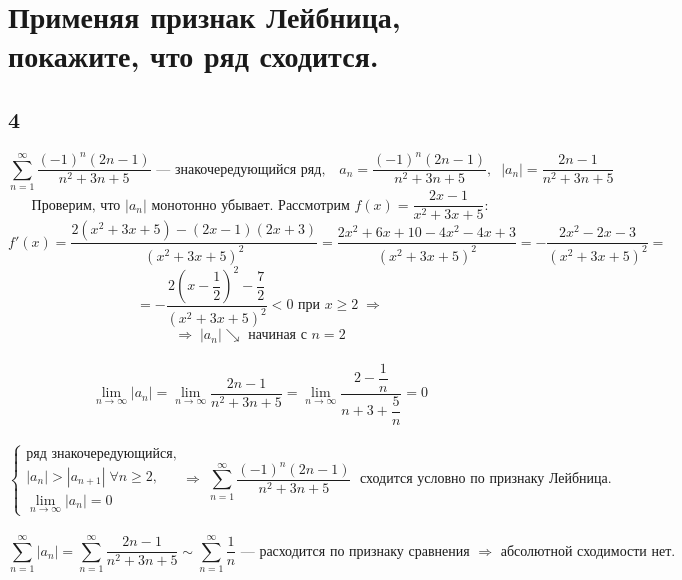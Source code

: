 \documentclass[a4paper,fleqn]{article}
\begin{document}
    \section*{Применяя признак Лейбница, покажите, что ряд сходится.}
    \subsection*{4}
    \[ \sum_{n=1}^{\infty} \dfrac{(-1)^n (2n-1)}{n^2 + 3n + 5} \text{ --- знакочередующийся ряд}, \;\;\;
		 a_n = \dfrac{(-1)^n (2n-1)}{n^2 + 3n + 5}, \;\; |a_n|  = \dfrac{2n-1}{n^2 + 3n + 5} \]
		\[ \text{Проверим, что $|a_n|$ монотонно убывает. Рассмотрим $f(x) = \dfrac{2x-1}{x^2 + 3x + 5}$:} \]
		\[ f'(x) = \dfrac{2(x^2 + 3x + 5) - (2x-1)(2x+3)}{(x^2 + 3x + 5)^2} = 
		\dfrac{2x^2 + 6x + 10 - 4x^2 - 4x + 3}{(x^2 + 3x + 5)^2} = 
		-\dfrac{2x^2 - 2x - 3}{(x^2 + 3x + 5)^2} = \]
		\[ = -\dfrac{2\left(x - \dfrac12\right)^2 - \dfrac72}{(x^2 + 3x + 5)^2} < 0 \text{ при } x \ge 2  \;\Rightarrow \]
		\[ \Rightarrow \; |a_n| \searrow \text{ начиная с } n = 2 \]\\[-20 pt]
		\[ \lim_{n\to\infty} |a_n| = \lim_{n\to\infty} \dfrac{2n-1}{n^2 + 3n + 5} = \lim_{n\to\infty}\dfrac{2-\dfrac1n}{n + 3 + \dfrac5n} = 0 \]\\[-10 pt]
		\[ \left\{\begin{array}{l} 
		\text{ряд знакочередующийся},\\[5 pt]
		|a_n| > |a_{n+1}| \; \forall n \ge 2,\\[5 pt]
		\lim_{n\to\infty} |a_n| = 0
		\end{array}\right.
		\Rightarrow \; \sum_{n=1}^{\infty} \dfrac{(-1)^n (2n-1)}{n^2 + 3n + 5} \; \text{ сходится условно по признаку Лейбница.} \]\\[-5 pt]
		\[ \sum_{n=1}^{\infty} |a_n| = \sum_{n=1}^{\infty} \dfrac{2n-1}{n^2 + 3n + 5} \sim \sum_{n=1}^{\infty} \dfrac{1}{n} \text{ --- расходится по признаку сравнения } \Rightarrow \text{ абсолютной сходимости нет.} \]\\

\end{document}
